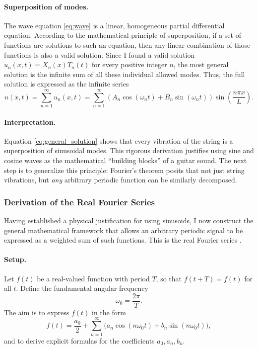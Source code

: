 \documentclass{article}
\begin{document}
\paragraph{Superposition of modes.}
The wave equation \eqref{eq:wave} is a linear, homogeneous partial differential equation. According to the mathematical principle of superposition, if a set of functions are solutions to such an equation, then any linear combination of those functions is also a valid solution. Since I found a valid solution $u_n(x,t) = X_n(x)T_n(t)$ for every positive integer $n$, the most general solution is the infinite sum of all these individual allowed modes. Thus, the full solution is expressed as the infinite series
\begin{equation}
    u(x,t) = \sum_{n=1}^{\infty} u_n(x,t) = \sum_{n=1}^{\infty} \left( A_n \cos(\omega_n t) + B_n \sin(\omega_n t) \right) 
    \sin\!\left(\frac{n\pi x}{L}\right).
    \label{eq:general_solution}
\end{equation}

\paragraph{Interpretation.}
Equation \eqref{eq:general_solution} shows that every vibration of the string is a superposition of sinusoidal modes. This rigorous derivation justifies using sine and cosine waves as the mathematical “building blocks” of a guitar sound. The next step is to generalize this principle: Fourier's theorem posits that not just string vibrations, but \emph{any} arbitrary periodic function can be similarly decomposed.

    \subsubsection{Derivation of the Real Fourier Series}

Having established a physical justification for using sinusoids, I now construct the general mathematical framework that allows an arbitrary periodic signal to be expressed as a weighted sum of such functions. This is the real Fourier series \cite{stein2003fourier}.

\paragraph{Setup.}
Let $f(t)$ be a real-valued function with period $T$, so that $f(t+T)=f(t)$ for all $t$. Define the fundamental angular frequency
\begin{equation}
    \omega_0 = \frac{2\pi}{T}.
\end{equation}
The aim is to express $f(t)$ in the form
\begin{equation}
    f(t) = \frac{a_0}{2} + \sum_{n=1}^\infty \big( a_n \cos(n\omega_0 t) + b_n \sin(n\omega_0 t) \big),
    \label{eq:fourier_series}
\end{equation}
and to derive explicit formulas for the coefficients $a_0, a_n, b_n$.
\end{document}

